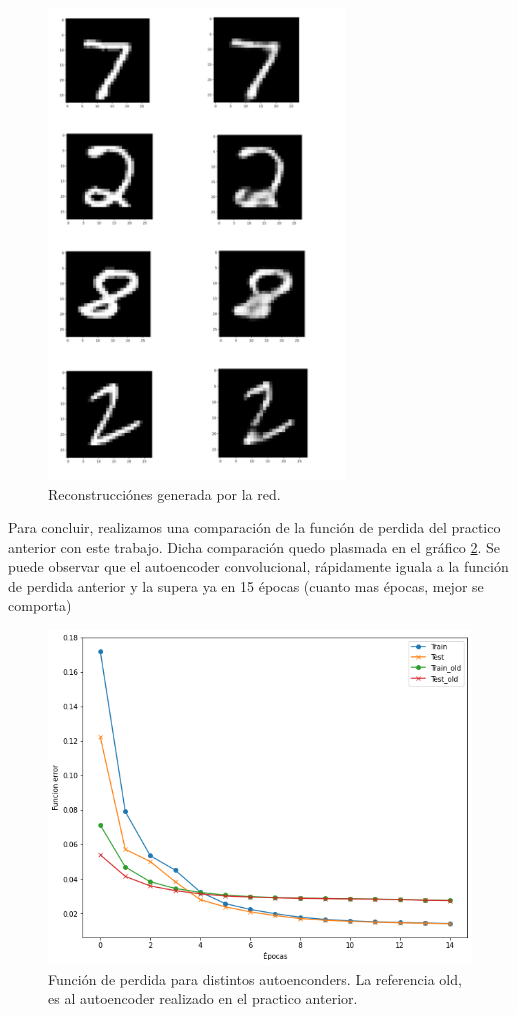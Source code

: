 \documentclass{article}
\begin{document}
\begin{figure}[H]
\centering
\includegraphics[width=0.7\textwidth]{reconstruccion.png}
\caption{Reconstrucciónes generada por la red. }
\label{fig3}
\end{figure}


Para concluir, realizamos una comparación de la función de perdida del practico anterior con este trabajo. Dicha comparación quedo plasmada en el gráfico  \ref{fig5}. Se puede observar que el autoencoder convolucional, rápidamente iguala a la función de perdida anterior y la supera ya en 15 épocas (cuanto mas épocas, mejor se comporta)

\begin{figure}[H]
\centering
\includegraphics[width=\textwidth]{compare.png}
\caption{Función de perdida para distintos autoenconders. La referencia old, es al autoencoder realizado en el practico anterior. }
\label{fig5}
\end{figure}
\end{document}
